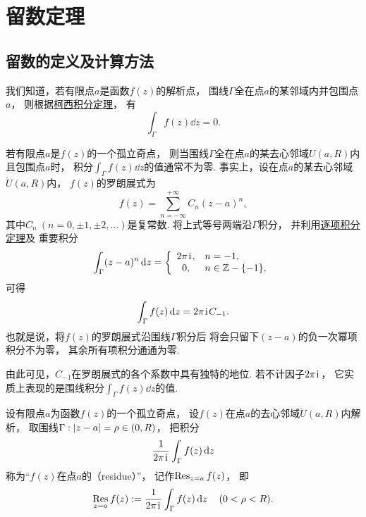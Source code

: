 \section{留数定理}
\subsection{留数的定义及计算方法}
我们知道，若有限点\(a\)是函数\(f(z)\)的解析点，
围线\(\Gamma\)全在点\(a\)的某邻域内并包围点\(a\)，
则根据\hyperref[theorem:解析函数的积分表示.柯西积分定理]{柯西积分定理}，
有\begin{equation*}
	\int_\Gamma f(z) \dd{z} = 0.
\end{equation*}

若有限点\(a\)是\(f(z)\)的一个孤立奇点，
则当围线\(\Gamma\)全在点\(a\)的某去心邻域\(U(a,R)\)内且包围点\(a\)时，
积分\(\int_\Gamma f(z) \dd{z}\)的值通常不为零.
事实上，设在点\(a\)的某去心邻域\(\mathring{U}(a,R)\)内，
\(f(z)\)的罗朗展式为\begin{equation*}
	f(z) = \sum_{n=-\infty}^{+\infty} C_n (z-a)^n,
\end{equation*}
其中\(C_n\ (n=0,\pm1,\pm2,\dotsc)\)是复常数.
将上式等号两端沿\(\Gamma\)积分，
并利用\hyperref[theorem:解析函数的级数表示.一致收敛级数的基本性质2]{逐项积分定理}及
重要积分  \begin{equation*}
	\int_\Gamma (z-a)^n \dd{z} = \left\{ \begin{array}{cl}
		2\pi\kern1pt\mathrm{i}\kern1pt, & n=-1, \\
		0,& n\in\mathbb{Z}-\{-1\},
	\end{array} \right.
\end{equation*}
可得\begin{equation*}
	\int_\Gamma f(z) \dd{z} = 2\pi\kern1pt\mathrm{i}\kern1pt C_{-1}.
\end{equation*}
也就是说，将\(f(z)\)的罗朗展式沿围线\(\Gamma\)积分后
将会只留下\((z-a)\)的负一次幂项积分不为零，
其余所有项积分通通为零.

由此可见，\(C_{-1}\)在罗朗展式的各个系数中具有独特的地位.
若不计因子\(2\pi\kern1pt\mathrm{i}\kern1pt\)，
它实质上表现的是围线积分\(\int_\Gamma f(z) \dd{z}\)的值.

\begin{definition}
设有限点\(a\)为函数\(f(z)\)的一个孤立奇点，
设\(f(z)\)在点\(a\)的去心邻域\(\mathring{U}(a,R)\)内解析，
取围线\(\Gamma: \abs{z-a}=\rho\in(0,R)\)，
把积分\begin{equation*}
	\frac{1}{2\pi\kern1pt\mathrm{i}\kern1pt} \int_\Gamma f(z) \dd{z}
\end{equation*}
称为“\(f(z)\)在点\(a\)的（residue）”，
记作\(\operatorname*{Res}_{z=a} f(z)\)，
即\begin{equation}\label{equation:留数定理.留数定义1}
	\operatorname*{Res}_{z=a} f(z)
	:=
	\frac{1}{2\pi\kern1pt\mathrm{i}\kern1pt} \int_\Gamma f(z) \dd{z}
	\quad(0<\rho<R).
\end{equation}
\end{definition}

